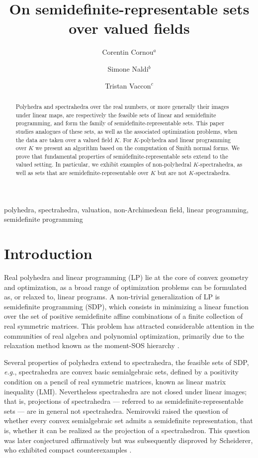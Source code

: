 \documentclass{elsarticle}
\author{Corentin Cornou$^a$}
\affiliation{
    organization={ENS Paris-Saclay},
    city={Gif-sur-Yvette},
    country={France}
}
\author{Simone Naldi$^b$}
\affiliation{
    organization={Università degli Studi di Cagliari, Palazzo delle Scienze, via Ospedale 72},
    city={Cagliari},
    country={Italy}
}
\author{Tristan Vaccon$^c$}
\affiliation{
    organization={Université de Limoges, CNRS, XLIM},
    city={Limoges},
    country={France}
}
\theoremstyle{plain}
\theoremstyle{definition}
\begin{document}
\title{On semidefinite-representable sets over valued fields}

\begin{abstract}
  Polyhedra and spectrahedra over the real numbers, or more generally
  their images under linear maps, are respectively the feasible sets
  of linear and semidefinite
  programming, and form the family of semidefinite-representable sets.
  This paper studies analogues of these sets, as well as
  the associated optimization problems, when the data are taken over a valued 
  field $K$.
  For $K$-polyhedra and linear programming over $K$ we present an algorithm
  based on the computation of Smith normal forms.
  We prove that fundamental properties of semidefinite-representable sets extend
  to the valued setting.
  In particular, we exhibit examples of non-polyhedral $K$-spectrahedra, as well as
 sets that are semidefinite-representable over $K$ but are not $K$-spectrahedra.
\end{abstract}

\begin{keyword}
  polyhedra, spectrahedra, valuation, non-Archimedean field, linear programming, semidefinite programming
\end{keyword}

\maketitle

\section{Introduction}
\label{sec:intro}

Real polyhedra and linear programming (LP) lie at the core
of convex geometry and optimization, as a broad range
of optimization problems can be formulated as, or relaxed to, linear programs.
A non-trivial generalization of LP is semidefinite programming (SDP),
which consists in minimizing a linear function over the set of
positive semidefinite affine combinations of a finite collection of
real symmetric matrices.
This problem has attracted considerable attention in the
communities of real algebra and polynomial optimization,
primarily due to the relaxation method known as the moment-SOS hierarchy
\cite{henrion2020moment}.

Several properties of polyhedra extend to spectrahedra, the feasible
sets of SDP, {\it e.g.}, spectrahedra are convex basic semialgebraic sets,
defined by a positivity condition on a pencil of real symmetric matrices,
known as linear matrix inequality (LMI).
Nevertheless spectrahedra are not closed under linear images; that is,
projections of spectrahedra --- referred to as semidefinite-representable sets ---
are in general not spectrahedra. Nemirovski
\cite{nemirovski2007advances} raised the question of whether every convex semialgebraic set admits
a semidefinite representation, that is, whether it can be realized as the projection
of a spectrahedron. This question was later conjectured affirmatively \cite{helton_sufficient_2008} 
but was subsequently disproved by Scheiderer, who
exhibited compact counterexamples \cite{scheiderer_spectrahedral_2017}.
\end{document}
